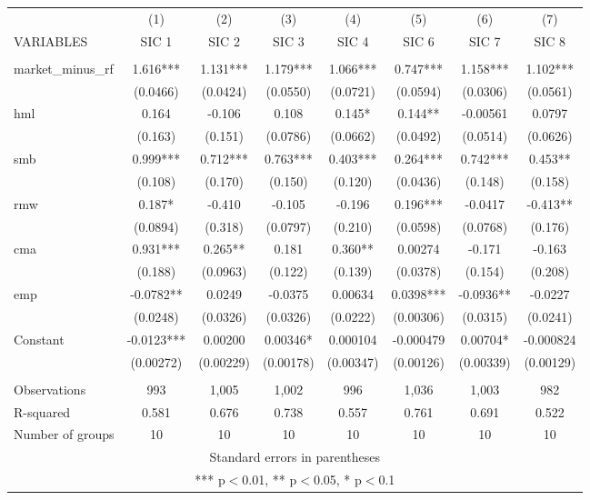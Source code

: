 \begin{tabular}{lccccccc} \hline
 & (1) & (2) & (3) & (4) & (5) & (6) & (7) \\
VARIABLES & SIC 1 & SIC 2 & SIC 3 & SIC 4 & SIC 6 & SIC 7 & SIC 8 \\ \hline
 &  &  &  &  &  &  &  \\
market\_minus\_rf & 1.616*** & 1.131*** & 1.179*** & 1.066*** & 0.747*** & 1.158*** & 1.102*** \\
 & (0.0466) & (0.0424) & (0.0550) & (0.0721) & (0.0594) & (0.0306) & (0.0561) \\
hml & 0.164 & -0.106 & 0.108 & 0.145* & 0.144** & -0.00561 & 0.0797 \\
 & (0.163) & (0.151) & (0.0786) & (0.0662) & (0.0492) & (0.0514) & (0.0626) \\
smb & 0.999*** & 0.712*** & 0.763*** & 0.403*** & 0.264*** & 0.742*** & 0.453** \\
 & (0.108) & (0.170) & (0.150) & (0.120) & (0.0436) & (0.148) & (0.158) \\
rmw & 0.187* & -0.410 & -0.105 & -0.196 & 0.196*** & -0.0417 & -0.413** \\
 & (0.0894) & (0.318) & (0.0797) & (0.210) & (0.0598) & (0.0768) & (0.176) \\
cma & 0.931*** & 0.265** & 0.181 & 0.360** & 0.00274 & -0.171 & -0.163 \\
 & (0.188) & (0.0963) & (0.122) & (0.139) & (0.0378) & (0.154) & (0.208) \\
emp & -0.0782** & 0.0249 & -0.0375 & 0.00634 & 0.0398*** & -0.0936** & -0.0227 \\
 & (0.0248) & (0.0326) & (0.0326) & (0.0222) & (0.00306) & (0.0315) & (0.0241) \\
Constant & -0.0123*** & 0.00200 & 0.00346* & 0.000104 & -0.000479 & 0.00704* & -0.000824 \\
 & (0.00272) & (0.00229) & (0.00178) & (0.00347) & (0.00126) & (0.00339) & (0.00129) \\
 &  &  &  &  &  &  &  \\
Observations & 993 & 1,005 & 1,002 & 996 & 1,036 & 1,003 & 982 \\
R-squared & 0.581 & 0.676 & 0.738 & 0.557 & 0.761 & 0.691 & 0.522 \\
 Number of groups & 10 & 10 & 10 & 10 & 10 & 10 & 10 \\ \hline
\multicolumn{8}{c}{ Standard errors in parentheses} \\
\multicolumn{8}{c}{ *** p$<$0.01, ** p$<$0.05, * p$<$0.1} \\
\end{tabular}
